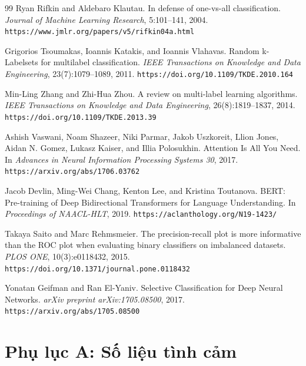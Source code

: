 \documentclass[12pt,a4paper]{article}
\begin{document}
\begin{thebibliography}{99}
Ryan Rifkin and Aldebaro Klautau.
In defense of one-vs-all classification.
\textit{Journal of Machine Learning Research}, 5:101--141, 2004.
\newline\texttt{https://www.jmlr.org/papers/v5/rifkin04a.html}

Grigorios Tsoumakas, Ioannis Katakis, and Ioannis Vlahavas.
Random k-Labelsets for multilabel classification.
\textit{IEEE Transactions on Knowledge and Data Engineering}, 23(7):1079--1089, 2011.
\newline\texttt{https://doi.org/10.1109/TKDE.2010.164}

Min-Ling Zhang and Zhi-Hua Zhou.
A review on multi-label learning algorithms.
\textit{IEEE Transactions on Knowledge and Data Engineering}, 26(8):1819--1837, 2014.
\newline\texttt{https://doi.org/10.1109/TKDE.2013.39}

Ashish Vaswani, Noam Shazeer, Niki Parmar, Jakob Uszkoreit, Llion Jones, Aidan N. Gomez, Lukasz Kaiser, and Illia Polosukhin.
Attention Is All You Need.
In \textit{Advances in Neural Information Processing Systems 30}, 2017.
\newline\texttt{https://arxiv.org/abs/1706.03762}

Jacob Devlin, Ming-Wei Chang, Kenton Lee, and Kristina Toutanova.
BERT: Pre-training of Deep Bidirectional Transformers for Language Understanding.
In \textit{Proceedings of NAACL-HLT}, 2019.
\newline\texttt{https://aclanthology.org/N19-1423/}

Takaya Saito and Marc Rehmsmeier.
The precision-recall plot is more informative than the ROC plot when evaluating binary classifiers on imbalanced datasets.
\textit{PLOS ONE}, 10(3):e0118432, 2015.
\newline\texttt{https://doi.org/10.1371/journal.pone.0118432}

Yonatan Geifman and Ran El-Yaniv.
Selective Classification for Deep Neural Networks.
\textit{arXiv preprint arXiv:1705.08500}, 2017.
\newline\texttt{https://arxiv.org/abs/1705.08500}

\end{thebibliography}

\clearpage
\section*{Phụ lục A: Số liệu tình cảm}
\end{document}
